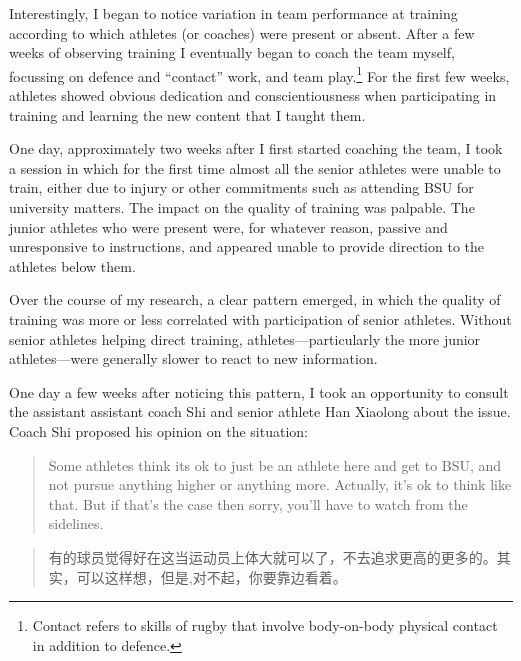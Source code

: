 \begin{CJK}{UTF8}{gbsn}
Interestingly, I began to notice variation in team performance at training according to which athletes (or coaches) were present or absent.  After a few weeks of observing training I eventually began to coach the team myself, focussing on defence and ``contact'' work, and team play.\footnote{Contact refers to skills of rugby that involve body-on-body physical contact in addition to defence.}  For the first few weeks, athletes showed obvious dedication and conscientiousness when participating in training and learning the new content that I taught them.

One day, approximately two weeks after I first started coaching the team,  I took a session in which for the first time almost all the senior athletes were unable to train, either due to injury or other commitments such as attending BSU for university matters.  The impact on the quality of training was palpable.  The junior athletes who were present were, for whatever reason, passive and unresponsive to instructions, and appeared unable to provide direction to the athletes below them.

Over the course of my research, a clear pattern emerged, in which the quality of training was more or less correlated with participation of senior athletes. Without senior athletes helping direct training, athletes---particularly the more junior athletes---were generally slower to react to new information.

One day a few weeks after noticing this pattern, I took an opportunity to consult the assistant assistant coach Shi and senior athlete Han Xiaolong about the issue.  Coach Shi proposed his opinion on the situation:
      \begin{quote}
     Some athletes think its ok to just be an athlete here and get to BSU, and not pursue anything higher or anything more.  Actually, it's ok to think like that. But if that's the case then sorry, you'll have to watch from the sidelines.
         \end{quote}
        \begin{quote}
             有的球员觉得好在这当运动员上体大就可以了，不去追求更高的更多的。其实，可以这样想，但是,对不起，你要靠边看着。
         \end{quote}



\end{CJK}

